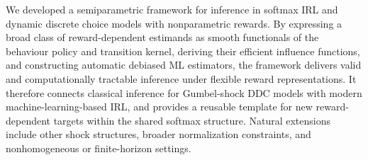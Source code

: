 \documentclass[12pt]{article}
\theoremstyle{plain}
\begin{document}
We developed a semiparametric framework for inference in softmax IRL and dynamic
discrete choice models with nonparametric rewards. By expressing a broad class
of reward-dependent estimands as smooth functionals of the behaviour policy and
transition kernel, deriving their efficient influence functions, and
constructing automatic debiased ML estimators, the framework delivers valid and
computationally tractable inference under flexible reward representations. It
therefore connects classical inference for Gumbel-shock DDC models with modern
machine-learning-based IRL, and provides a reusable template for new
reward-dependent targets within the shared softmax structure.
Natural extensions include other shock structures, broader normalization
constraints, and nonhomogeneous or finite-horizon settings.




{
 \singlespacing 
 }
\end{document}
